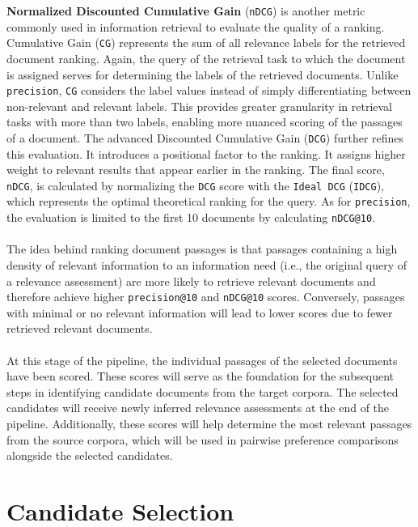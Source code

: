 \textbf{Normalized Discounted Cumulative Gain} (\texttt{nDCG}) is another metric commonly used in information retrieval to evaluate the quality of a ranking. Cumulative Gain (\texttt{CG}) represents the sum of all relevance labels for the retrieved document ranking. Again, the query of the retrieval task to which the document is assigned serves for determining the labels of the retrieved documents. Unlike \texttt{precision}, \texttt{CG} considers the label values instead of simply differentiating between non-relevant and relevant labels. This provides greater granularity in retrieval tasks with more than two labels, enabling more nuanced scoring of the passages of a document. The advanced Discounted Cumulative Gain (\texttt{DCG}) further refines this evaluation. It introduces a positional factor to the ranking. It assigns higher weight to relevant results that appear earlier in the ranking. The final score, \texttt{nDCG}, is calculated by normalizing the \texttt{DCG} score with the \texttt{Ideal DCG} (\texttt{IDCG}), which represents the optimal theoretical ranking for the query. As for \texttt{precision}, the evaluation is limited to the first 10 documents by calculating \texttt{nDCG@10}.
\\\\
The idea behind ranking document passages is that passages containing a high density of relevant information to an information need (i.e., the original query of a relevance assessment) are more likely to retrieve relevant documents and therefore achieve higher \texttt{precision@10} and \texttt{nDCG@10} scores. Conversely, passages with minimal or no relevant information will lead to lower scores due to fewer retrieved relevant documents.
\\\\
At this stage of the pipeline, the individual passages of the selected documents have been scored. These scores will serve as the foundation for the subsequent steps in identifying candidate documents from the target corpora. The selected candidates will receive newly inferred relevance assessments at the end of the pipeline. Additionally, these scores will help determine the most relevant passages from the source corpora, which will be used in pairwise preference comparisons alongside the selected candidates.


\section{Candidate Selection}\label{candidate-selection}

